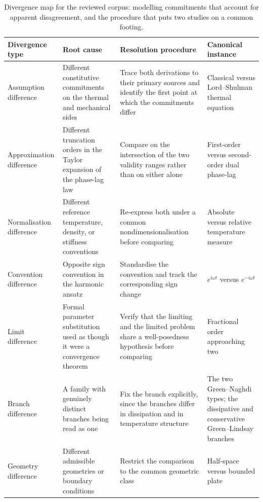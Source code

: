 \begin{table}[h]
\centering
\small
\caption{Divergence map for the reviewed corpus: modelling commitments that account for apparent disagreement, and the procedure that puts two studies on a common footing.}
\label{tab:divergence_map}
\begin{tabularx}{\textwidth}{@{}lXXl@{}}
\toprule
\textbf{Divergence type} & \textbf{Root cause} & \textbf{Resolution procedure} & \textbf{Canonical instance} \\
\midrule
Assumption difference & Different constitutive commitments on the thermal and mechanical sides & Trace both derivations to their primary sources and identify the first point at which the commitments differ & Classical versus Lord--Shulman thermal equation \\
Approximation difference & Different truncation orders in the Taylor expansion of the phase-lag law & Compare on the intersection of the two validity ranges rather than on either alone & First-order versus second-order dual phase-lag \\
Normalisation difference & Different reference temperature, density, or stiffness conventions & Re-express both under a common nondimensionalisation before comparing & Absolute versus relative temperature measure \\
Convention difference & Opposite sign convention in the harmonic ansatz & Standardise the convention and track the corresponding sign change & $e^{i\omega t}$ versus $e^{-i\omega t}$ \\
Limit difference & Formal parameter substitution used as though it were a convergence theorem & Verify that the limiting and the limited problem share a well-posedness hypothesis before comparing & Fractional order approaching two \\
Branch difference & A family with genuinely distinct branches being read as one & Fix the branch explicitly, since the branches differ in dissipation and in temperature structure & The two Green--Naghdi types; the dissipative and conservative Green--Lindsay branches \\
Geometry difference & Different admissible geometries or boundary conditions & Restrict the comparison to the common geometric class & Half-space versus bounded plate \\
\bottomrule
\end{tabularx}
\end{table}

